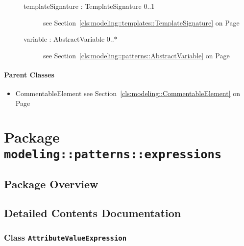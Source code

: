 \begin{description}
\begin{description}
	
\item[templateSignature : TemplateSignature 			\symbol{"5B}0..1\symbol{"5D}]
see Section~\ref{cls:modeling::templates::TemplateSignature} on Page~\pageref{cls:modeling::templates::TemplateSignature}\hspace{\fill}
\nopagebreak


	
\item[variable : AbstractVariable 			\symbol{"5B}0..$*$\symbol{"5D}]
see Section~\ref{cls:modeling::patterns::AbstractVariable} on Page~\pageref{cls:modeling::patterns::AbstractVariable}\hspace{\fill}
\nopagebreak


	
	\end{description}
	

\end{description}

\paragraph{Parent Classes}
\begin{itemize}
\item CommentableElement see Section~\ref{cls:modeling::CommentableElement} on Page~\pageref{cls:modeling::CommentableElement}\end{itemize}
\newpage
		


\section{Package \bfseries \texttt{modeling::patterns::expressions}\normalfont}
\subsection{Package Overview}
	
			
		



\subsection{Detailed Contents Documentation}
\subsubsection{\Large{Class \bfseries \texttt{AttributeValueExpression}\normalfont}}
\label{cls:modeling::patterns::expressions::AttributeValueExpression} 
